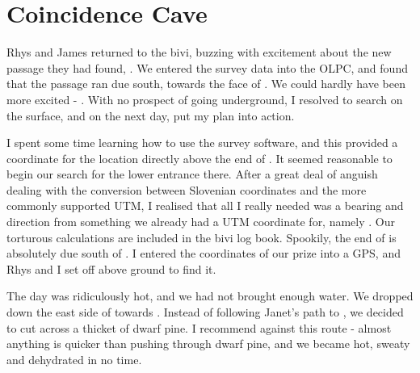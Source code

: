 \section{Coincidence Cave}
\label{sec: coincidence cave}


    Rhys and James returned to the bivi, buzzing with excitement about the new passage they had found, . We entered the survey data into the OLPC, and found that the passage ran due south, towards the face of . We could hardly have been more excited - . With no prospect of going underground, I resolved to search on the surface, and on the next day, put my plan into action.

    I spent some time learning how to use the survey software, and this provided a coordinate for the location directly above the end of . It seemed reasonable to begin our search for the lower entrance there. After a great deal of anguish dealing with the conversion between Slovenian coordinates and the more commonly supported UTM, I realised that all I really needed was a bearing and direction from something we already had a UTM coordinate for, namely . Our torturous calculations are included in the bivi log book. Spookily, the end of  is absolutely due south of . I entered the coordinates of our prize into a GPS, and Rhys and I set off above ground to find it.

    The day was ridiculously hot, and we had not brought enough water. We dropped down the east side of  towards . Instead of following Janet's path to , we decided to cut across a thicket of dwarf pine. I recommend against this route - almost anything is quicker than pushing through dwarf pine, and we became hot, sweaty and dehydrated in no time.

